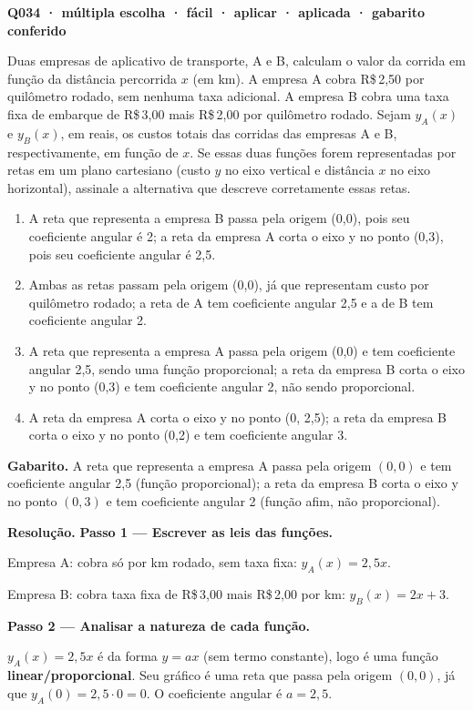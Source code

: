 \documentclass[11pt,a4paper]{article}
\begin{document}
\bigskip\noindent\textbf{Q034 · múltipla escolha · fácil · aplicar · aplicada · gabarito conferido}\par\nopagebreak
Duas empresas de aplicativo de transporte, A e B, calculam o valor da corrida em função da distância percorrida $x$ (em km). A empresa A cobra R\$\,2,50 por quilômetro rodado, sem nenhuma taxa adicional. A empresa B cobra uma taxa fixa de embarque de R\$\,3,00 mais R\$\,2,00 por quilômetro rodado. Sejam $y_A(x)$ e $y_B(x)$, em reais, os custos totais das corridas das empresas A e B, respectivamente, em função de $x$. Se essas duas funções forem representadas por retas em um plano cartesiano (custo $y$ no eixo vertical e distância $x$ no eixo horizontal), assinale a alternativa que descreve corretamente essas retas.
\begin{enumerate}[label=(\alph*)]
\item A reta que representa a empresa B passa pela origem (0,0), pois seu coeficiente angular é 2; a reta da empresa A corta o eixo y no ponto (0,3), pois seu coeficiente angular é 2,5.
\item Ambas as retas passam pela origem (0,0), já que representam custo por quilômetro rodado; a reta de A tem coeficiente angular 2,5 e a de B tem coeficiente angular 2.
\item A reta que representa a empresa A passa pela origem (0,0) e tem coeficiente angular 2,5, sendo uma função proporcional; a reta da empresa B corta o eixo y no ponto (0,3) e tem coeficiente angular 2, não sendo proporcional.
\item A reta da empresa A corta o eixo y no ponto (0, 2,5); a reta da empresa B corta o eixo y no ponto (0,2) e tem coeficiente angular 3.
\end{enumerate}

\textbf{Gabarito.} A reta que representa a empresa A passa pela origem $(0,0)$ e tem coeficiente angular 2,5 (função proporcional); a reta da empresa B corta o eixo y no ponto $(0,3)$ e tem coeficiente angular 2 (função afim, não proporcional).

\textbf{Resolução.} \textbf{Passo 1 — Escrever as leis das funções.}

Empresa A: cobra só por km rodado, sem taxa fixa: $y_A(x) = 2{,}5x$.

Empresa B: cobra taxa fixa de R\$\,3,00 mais R\$\,2,00 por km: $y_B(x) = 2x + 3$.

\textbf{Passo 2 — Analisar a natureza de cada função.}

$y_A(x) = 2{,}5x$ é da forma $y = ax$ (sem termo constante), logo é uma função \textbf{linear/proporcional}. Seu gráfico é uma reta que passa pela origem $(0,0)$, já que $y_A(0) = 2{,}5 \cdot 0 = 0$. O coeficiente angular é $a = 2{,}5$.
\end{document}
